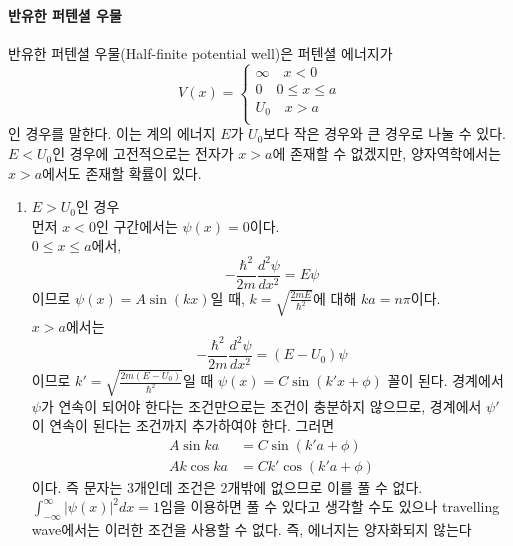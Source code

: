 \paragraph{반유한 퍼텐셜 우물}
반유한 퍼텐셜 우물(Half-finite potential well)은 퍼텐셜 에너지가
\begin{equation}
V(x)=\begin{cases}
\infty\quad x<0\\
0\quad 0\leq x \leq a\\
U_0 \quad x>a\\
\end{cases}
\end{equation}
인 경우를 말한다. 이는 계의 에너지 $E$가 $U_0$보다 작은 경우와 큰 경우로 나눌 수 있다. $E<U_0$인 경우에 고전적으로는 전자가 $x>a$에 존재할 수 없겠지만, 양자역학에서는 $x>a$에서도 존재할 확률이 있다.
\begin{enumerate}
\item $E>U_0$인 경우\\
먼저 $x<0$인 구간에서는 $\psi(x)=0$이다.\\
$0\le x \le a$에서, \begin{equation}
-\frac{\hbar^2}{2m}\frac{d^2\psi}{dx^2}=E\psi
\end{equation}
이므로 $\psi(x)=A\sin(kx)$일 때, $k=\sqrt{\frac{2mE}{\hbar^2}}$에 대해 $ka=n\pi$이다.\\
$x>a$에서는 
\begin{equation}
-\frac{\hbar^2}{2m}\frac{d^2\psi}{dx^2}=(E-U_0)\psi
\end{equation}
이므로 $k'=\sqrt{\frac{2m(E-U_0)}{\hbar^2}}$일 때 $\psi(x) = C\sin(k'x+\phi)$ 꼴이 된다. 경계에서 $\psi$가 연속이 되어야 한다는 조건만으로는 조건이 충분하지 않으므로, 경계에서 $\psi'$이 연속이 된다는 조건까지 추가하여야 한다. 그러면
\begin{align}
A\sin ka&=C\sin(k'a+\phi)\\
Ak\cos ka &= Ck'\cos(k'a+\phi)
\end{align}
이다. 즉 문자는 3개인데 조건은 2개밖에 없으므로 이를 풀 수 없다. $\int_{-\infty}^\infty |\psi(x)|^2 dx=1$임을 이용하면 풀 수 있다고 생각할 수도 있으나 travelling wave에서는 이러한 조건을 사용할 수 없다. 즉, 에너지는 양자화되지 않는다


\end{enumerate}
